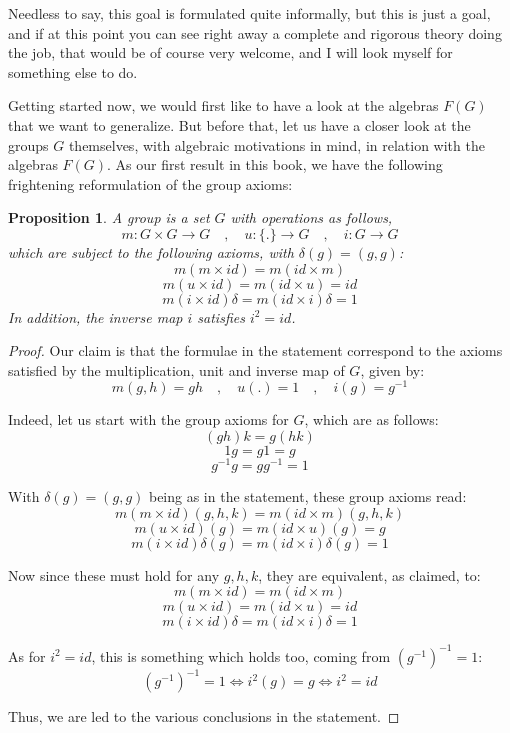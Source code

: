\documentclass[12pt]{amsbook}
\newtheorem{proposition}[theorem]{Proposition}
\begin{document}
Needless to say, this goal is formulated quite informally, but this is just a goal, and if at this point you can see right away a complete and rigorous theory doing the job, that would be of course very welcome, and I will look myself for something else to do.

\bigskip

Getting started now, we would first like to have a look at the algebras $F(G)$ that we want to generalize. But before that, let us have a closer look at the groups $G$ themselves, with algebraic motivations in mind, in relation with the algebras $F(G)$. As our first result in this book, we have the following frightening reformulation of the group axioms:


\begin{proposition}
A group is a set $G$ with operations as follows,
$$m:G\times G\to G\quad,\quad
u:\{.\}\to G\quad,\quad
i:G\to G$$
which are subject to the following axioms, with $\delta(g)=(g,g)$:
$$m(m\times id)=m(id\times m)$$
$$m(u\times id)=m(id\times u)=id$$
$$m(i\times id)\delta=m(id\times i)\delta=1$$
In addition, the inverse map $i$ satisfies $i^2=id$.
\end{proposition}

\begin{proof}
Our claim is that the formulae in the statement correspond to the axioms satisfied by the multiplication, unit and inverse map of $G$, given by:
$$m(g,h)=gh\quad,\quad u(.)=1\quad,\quad i(g)=g^{-1}$$

Indeed, let us start with the group axioms for $G$, which are as follows:
$$(gh)k=g(hk)$$
$$1g=g1=g$$
$$g^{-1}g=gg^{-1}=1$$ 

With $\delta(g)=(g,g)$ being as in the statement, these group axioms read:
$$m(m\times id)(g,h,k)=m(id\times m)(g,h,k)$$
$$m(u\times id)(g)=m(id\times u)(g)=g$$
$$m(i\times id)\delta(g)=m(id\times i)\delta(g)=1$$

Now since these must hold for any $g,h,k$, they are equivalent, as claimed, to:
$$m(m\times id)=m(id\times m)$$
$$m(u\times id)=m(id\times u)=id$$
$$m(i\times id)\delta=m(id\times i)\delta=1$$

As for $i^2=id$, this is something which holds too, coming from $(g^{-1})^{-1}=1$:
$$(g^{-1})^{-1}=1\iff i^2(g)=g\iff i^2=id$$

Thus, we are led to the various conclusions in the statement.
\end{proof}
\end{document}
